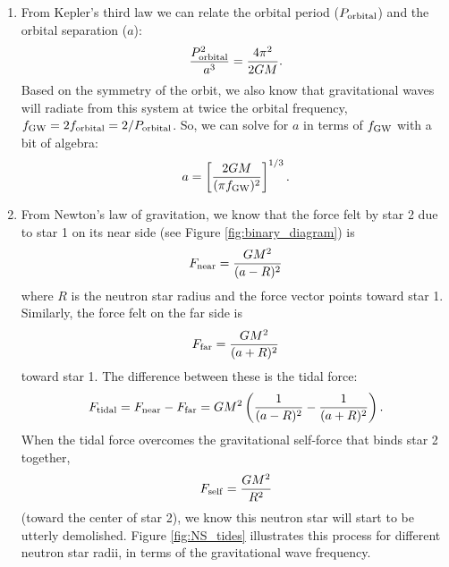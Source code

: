 \documentclass[11pt]{article}
\begin{document}
\begin{enumerate}

\item From Kepler's third law we can relate the orbital period ($P_{\rm orbital}$) and the orbital separation ($a$):
\[
\frac{P^2_{\rm orbital}}{a^3} = \frac{4\pi^2}{2GM}.
\]
Based on the symmetry of the orbit, we also know that gravitational waves will radiate from this system at twice the orbital frequency, $f_{\rm GW} = 2f_{\rm orbital} = 2/P_{\rm orbital}$. So, we can solve for $a$ in terms of $f_{\rm GW}$ with a bit of algebra:
\begin{equation}
a = \left[ \frac{2GM}{(\pi f_{\rm GW})^2} \right]^{1/3}.
\end{equation}

\item From Newton's law of gravitation, we know that the force felt by star 2 due to star 1 on its near side (see Figure \ref{fig:binary_diagram}) is
\begin{equation}
F_{\rm near} = \frac{GM^2}{(a - R)^2}
\end{equation}
where $R$ is the neutron star radius and the force vector points toward star 1. Similarly, the force felt on the far side is
\begin{equation}
F_{\rm far} = \frac{GM^2}{(a + R)^2}
\end{equation}
toward star 1. The difference between these is the tidal force:
\begin{equation}
F_{\rm tidal} = F_{\rm near} - F_{\rm far} = GM^2 \left( \frac{1}{(a - R)^2} - \frac{1}{(a + R)^2} \right).
\end{equation}
When the tidal force overcomes the gravitational self-force that binds star 2 together,
\begin{equation}
F_{\rm self} = \frac{GM^2}{R^2}
\end{equation}
(toward the center of star 2), we know this neutron star will start to be utterly demolished. Figure \ref{fig:NS_tides} illustrates this process for different neutron star radii, in terms of the gravitational wave frequency.

\end{enumerate}
\end{document}
